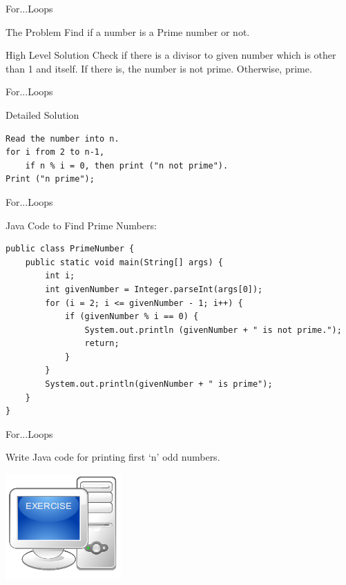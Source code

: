 \documentclass[14pt]{beamer}
\begin{document}
\begin{frame}{For...Loops}
\begin{block}{The Problem}
Find if a number is a Prime number or not.
\end{block}
\begin{block}{High Level Solution}
Check if there is a divisor to given number which is other than 1 and itself. If there is, the number is not prime. Otherwise, prime.
\end{block}
\end{frame}

\begin{frame}[fragile]{For...Loops}
\begin{block}{Detailed Solution}
\begin{lstlisting}[numbers=none]
Read the number into n.
for i from 2 to n-1, 
    if n % i = 0, then print ("n not prime").
Print ("n prime");
\end{lstlisting}
\end{block}
\end{frame}

\begin{frame}[fragile]{For...Loops}
\begin{block}{Java Code to Find Prime Numbers:}
\begin{lstlisting}[numbers=none]
public class PrimeNumber {
    public static void main(String[] args) {
        int i;
        int givenNumber = Integer.parseInt(args[0]);
        for (i = 2; i <= givenNumber - 1; i++) {
            if (givenNumber % i == 0) {
                System.out.println (givenNumber + " is not prime.");
                return;
            }
        }
        System.out.println(givenNumber + " is prime");
    }
}
\end{lstlisting}
\end{block}
\end{frame}

\begin{frame}{For...Loops}
\begin{minipage}{7cm}
Write Java code for printing first `n' odd numbers.
\end{minipage}
\quad
\begin{minipage}{2cm}
 \includegraphics[scale=.5]{exercise.png}
\end{minipage}
\end{frame}
\end{document}
